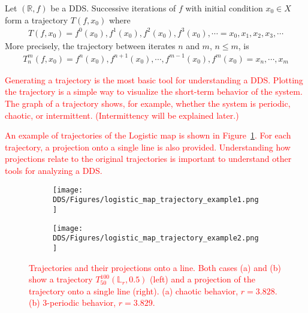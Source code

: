 \begin{definition}[Trajectory]
    Let $\left( \mathbb{R}, f \right)$ be a DDS. Successive iterations of $f$ with initial condition $x_0 \in X$ form a trajectory $T(f, x_0)$ where \begin{eqnarray}
        T(f, x_0) = f^0(x_0), f^1(x_0), f^2(x_0), f^3(x_0), \cdots  = x_0, x_1, x_2, x_3, \cdots
    \end{eqnarray}
    More precisely, the trajectory between iterates $n$ and $m$, $n \leq m$, is
    \begin{eqnarray}
        T_{n}^{m}(f, x_0) = f^{n}(x_0), f^{n+1}(x_0), \cdots, f^{m-1}(x_0), f^{m}(x_0) = x_n, \cdots, x_m
    \end{eqnarray}
\end{definition}

\begin{remark}
    \textcolor{red}{
    Generating a trajectory is the most basic tool for understanding a DDS.
    Plotting the trajectory is a simple way to visualize the short-term behavior of the system.
    The graph of a trajectory shows, for example, whether the system is periodic, chaotic, or intermittent. (Intermittency will be explained later.)
    }
    \par
    \textcolor{red}{
    An example of trajectories of the Logistic map is shown in Figure~\ref{fig:trajectory_example}.
    For each trajectory, a projection onto a single line is also provided.
    Understanding how projections relate to the original trajectories is important to understand other tools for analyzing a DDS.
    }
\end{remark}

\begin{figure}[!h]
    \centering
    \begin{subfigure}{0.6\textwidth}
        \centering
        \texttt{[image: DDS/Figures/logistic\_map\_trajectory\_example1.png]}
        \caption{}
    \end{subfigure}
    \hfill
    \begin{subfigure}{0.6\textwidth}
        \centering
        \texttt{[image: DDS/Figures/logistic\_map\_trajectory\_example2.png]}
        \caption{}
    \end{subfigure}

    \caption{
        \textcolor{red}{ 
        Trajectories and their projections onto a line.
        Both cases (a) and (b) show a trajectory $T_{50}^{100}(\mathbb{L}_{r}, 0.5)$ (left) and a projection of the trajectory onto a single line (right). 
        (a) chaotic behavior, $r = 3.828$. 
        (b) $3$-periodic behavior, $r = 3.829$. 
        }
    }
    \label{fig:trajectory_example}
\end{figure}


